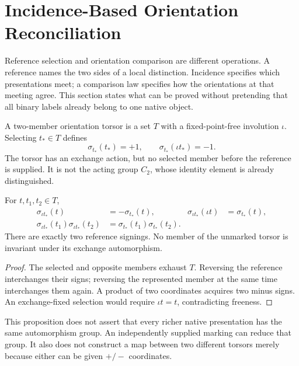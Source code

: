 \begingroup
\renewcommand{\thesection}{13D}
\section{Incidence-Based Orientation Reconciliation}\label{sec:incidencereconciliation}
Reference selection and orientation comparison are different operations. A reference names the two sides of a local distinction. Incidence specifies which presentations meet; a comparison law specifies how the orientations at that meeting agree. This section states what can be proved without pretending that all binary labels already belong to one native object.

\begin{definition}\label{def:referencetorsor}
A two-member orientation torsor is a set $T$ with a fixed-point-free involution $\iota$. Selecting $t_*\in T$ defines
\begin{equation}
\sigma_{t_*}(t_*)=+1,\qquad
\sigma_{t_*}(\iota t_*)=-1.
\tag{RF4}\label{eq:referencesigning}
\end{equation}
The torsor has an exchange action, but no selected member before the reference is supplied. It is not the acting group $C_2$, whose identity element is already distinguished.
\end{definition}

\begin{proposition}\label{prop:referencechange}
For $t,t_1,t_2\in T$,
\begin{equation}
\begin{aligned}
\sigma_{\iota t_*}(t)&=-\sigma_{t_*}(t),&
\sigma_{\iota t_*}(\iota t)&=\sigma_{t_*}(t),\\
\sigma_{\iota t_*}(t_1)\sigma_{\iota t_*}(t_2)
&=\sigma_{t_*}(t_1)\sigma_{t_*}(t_2).
\end{aligned}
\tag{RF5}\label{eq:referencechange}
\end{equation}
There are exactly two reference signings. No member of the unmarked torsor is invariant under its exchange automorphism.
\end{proposition}
\begin{proof}
The selected and opposite members exhaust $T$. Reversing the reference interchanges their signs; reversing the represented member at the same time interchanges them again. A product of two coordinates acquires two minus signs. An exchange-fixed selection would require $\iota t=t$, contradicting freeness.
\end{proof}
This proposition does not assert that every richer native presentation has the same automorphism group. An independently supplied marking can reduce that group. It also does not construct a map between two different torsors merely because either can be given $+/-$ coordinates.

